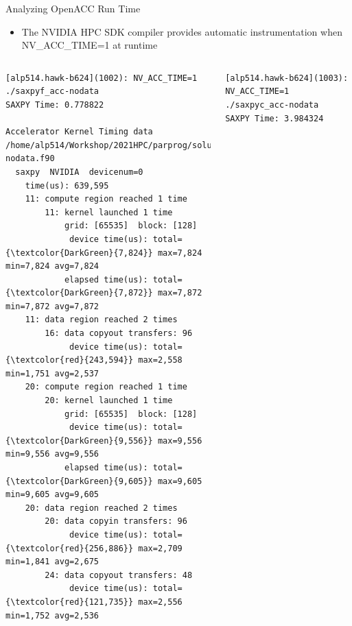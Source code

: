 \documentclass[10pt,t]{beamer}
\begin{document}
\begin{frame}[fragile]{Analyzing OpenACC Run Time}
  \begin{itemize}
    \item The NVIDIA HPC SDK compiler provides automatic instrumentation when {\color{orange}NV\_ACC\_TIME=1} at runtime
  \end{itemize}
  \begin{block}{}
    \begin{columns}[t]
    \begin{Verbatim}[fontsize=\fontsize{3.5}{4.5}\selectfont,commandchars=\\\{\}]
[alp514.hawk-b624](1002): NV_ACC_TIME=1 ./saxpyf_acc-nodata
SAXPY Time: 0.778822

Accelerator Kernel Timing data
/home/alp514/Workshop/2021HPC/parprog/solution/saxpy/saxpy_acc-nodata.f90
  saxpy  NVIDIA  devicenum=0
    time(us): 639,595
    11: compute region reached 1 time
        11: kernel launched 1 time
            grid: [65535]  block: [128]
             device time(us): total={\textcolor{DarkGreen}{7,824}} max=7,824 min=7,824 avg=7,824
            elapsed time(us): total={\textcolor{DarkGreen}{7,872}} max=7,872 min=7,872 avg=7,872
    11: data region reached 2 times
        16: data copyout transfers: 96
             device time(us): total={\textcolor{red}{243,594}} max=2,558 min=1,751 avg=2,537
    20: compute region reached 1 time
        20: kernel launched 1 time
            grid: [65535]  block: [128]
             device time(us): total={\textcolor{DarkGreen}{9,556}} max=9,556 min=9,556 avg=9,556
            elapsed time(us): total={\textcolor{DarkGreen}{9,605}} max=9,605 min=9,605 avg=9,605
    20: data region reached 2 times
        20: data copyin transfers: 96
             device time(us): total={\textcolor{red}{256,886}} max=2,709 min=1,841 avg=2,675
        24: data copyout transfers: 48
             device time(us): total={\textcolor{red}{121,735}} max=2,556 min=1,752 avg=2,536
    \end{Verbatim}
    \begin{Verbatim}[fontsize=\fontsize{3.5}{4.5}\selectfont,commandchars=\\\{\}]
[alp514.hawk-b624](1003): NV_ACC_TIME=1 ./saxpyc_acc-nodata
SAXPY Time: 3.984324


\end{Verbatim}
\end{columns}
\end{block}
\end{frame}
\end{document}

